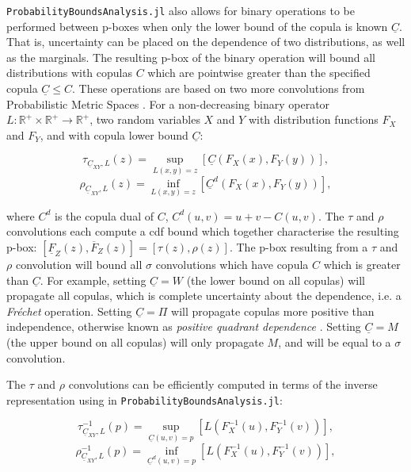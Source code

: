 \documentclass{juliacon}
\begin{document}
\texttt{ProbabilityBoundsAnalysis.jl} also allows for binary operations to be performed between p-boxes when only the lower bound of the copula is known $\underline{C}$. That is, uncertainty can be placed on the dependence of two distributions, as well as the marginals. The resulting p-box of the binary operation will bound all distributions with copulas $C$ which are pointwise greater than the specified copula $\underline{C} \leq C$. These operations are based on two more convolutions from Probabilistic Metric Spaces \cite{schweizer2011probabilistic}. For a non-decreasing binary operator $L: \mathbb{R}^+\times \mathbb{R}^+ \to \mathbb{R}^+$, two random variables $X$ and $Y$ with distribution functions $F_X$ and $F_Y$, and with copula lower bound $\underline{C}$:

\begin{equation*}\label{taupbox}
  \tau_{\underline{C}_{XY},L}(z) = \sup_{L(x,y)=z} [\underline{C}(F_{X}(x), F_Y(y))],
\end{equation*}
\begin{equation*}\label{rhopbox}
  \rho_{\underline{C}_{XY},L}(z) = \inf_{L(x,y)=z} [\underline{C}^d(F_{X}(x), F_Y(y))],
\end{equation*}

where $C^d$ is the copula dual of $C$, $C^d(u,v) = u + v - C(u,v)$. The $\tau$ and $\rho$ convolutions each compute a cdf bound which together characterise the resulting p-box: $[\underline{F}_{Z}(z), \overline{F}_{Z}(z)] = [\tau(z), \rho(z)]$. The p-box resulting from a $\tau$ and $\rho$ convolution will bound all $\sigma$ convolutions which have copula $C$ which is greater than $\underline{C}$. For example, setting $\underline{C} = W$ (the lower bound on all copulas) will propagate all copulas, which is complete uncertainty about the dependence, i.e. a \textit{Fréchet} operation. Setting $\underline{C} = \Pi$ will propagate copulas more positive than independence, otherwise known as \textit{positive quadrant dependence} \cite{nelsen2007introduction}. Setting $\underline{C} = M$ (the upper bound on all copulas) will only propagate $M$, and will be equal to a $\sigma$ convolution. 

The $\tau$ and $\rho$ convolutions can be efficiently computed in terms of the inverse representation using in \texttt{ProbabilityBoundsAnalysis.jl}: 

\begin{equation*}\label{taupbox2}
  \tau^{-1}_{\underline{C}_{XY},L}(p) = \sup_{\underline{C}(u,v) = p} [L(F^{-1}_{X}(u), F^{-1}_Y(v))],
\end{equation*}
\begin{equation*}\label{rhopbox2}
  \rho^{-1}_{\underline{C}_{XY},L}(p) = \inf_{\underline{C}^{d}(u,v) = p} [L(F^{-1}_{X}(u), F^{-1}_Y(v))],
\end{equation*}
\end{document}
